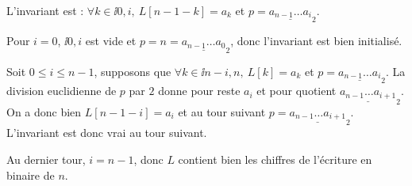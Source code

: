 L'invariant est : \og $\forall k \in \ii{0,i},~ L[n-1-k] = a_{k}$ et $p = \underline{a_{n-1}\dots a_{i}}_2$\fg{}. 

Pour $i=0$, $\ii{0,i}$ est vide et $p = n =  \underline{a_{n-1}\dots a_{0}}_2$, donc l'invariant est bien initialisé. 

Soit $0 \leq i \leq n-1$, supposons que $\forall k \in \ii{n-i,n},~ L[k] = a_k$ et $p = \underline{a_{n-1}\dots a_{i}}_2$. 
La division euclidienne de $p$ par $2$ donne pour reste $a_{i}$ et pour quotient $\underline{a_{n-1}\dots a_{i+1}}_2$.
On a donc bien $L[n-1-i] = a_i$ et au tour suivant $p = \underline{a_{n-1}\dots a_{i+1}}_2$. L'invariant est donc vrai au tour suivant. 

Au dernier tour, $i = n-1$, donc $L$ contient bien les chiffres de l'écriture en binaire de $n$. 